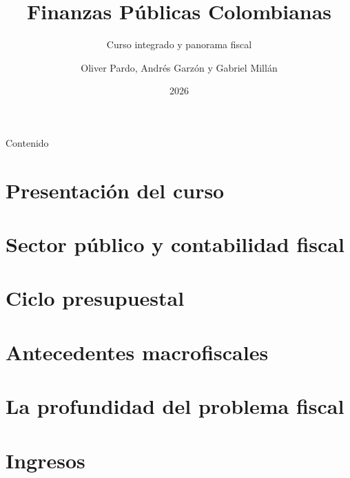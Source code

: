 \documentclass[aspectratio=169,10pt]{beamer}
\title[Finanzas Públicas Colombianas]{Finanzas Públicas Colombianas}
\subtitle{Curso integrado y panorama fiscal}
\author{Oliver Pardo, Andrés Garzón y Gabriel Millán}
\institute{Pontificia Universidad Javeriana}
\date{2026}
\begin{document}
\begin{frame}
  \titlepage
\end{frame}

\begin{frame}{Contenido}
  \tableofcontents
\end{frame}

\section{Presentación del curso}


\section{Sector público y contabilidad fiscal}


\section{Ciclo presupuestal}


\section{Antecedentes macrofiscales}






























\section{La profundidad del problema fiscal}



\section{Ingresos}











\end{document}

